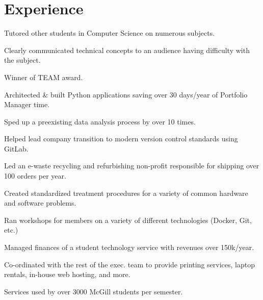 \documentclass[]{willguthrie-resume}
\begin{document}
\begin{minipage}[t]{0.66\textwidth}


	\section{Experience}

	\vspace{\topsep} %
	\begin{tightemize}
		\item Tutored other students in Computer Science on numerous subjects.
		\item Clearly communicated technical concepts to an audience having difficulty with the subject. 
		\item Winner of TEAM award.
	\end{tightemize}

	\begin{tightemize}
		\item Architected \& built Python applications saving over 30 days/year of Portfolio Manager time.
		\item Sped up a preexisting data analysis process by over 10 times.
		\item Helped lead company transition to modern version control standards using GitLab.
	\end{tightemize}

	\begin{tightemize}
		\item Led an e-waste recycling and refurbishing non-profit responsible for shipping over 100 orders per year.
		\item Created standardized treatment procedures for a variety of common hardware and software problems.
		\item Ran workshops for members on a variety of different technologies (Docker, Git, etc.) 
	\end{tightemize}

	\begin{tightemize}
		\item Managed finances of a student technology service with revenues over 150k/year.
		\item Co-ordinated with the rest of the exec. team to provide printing services, laptop rentals, in-house web hosting, and more.
		\item Services used by over 3000 McGill students per semester.
	\end{tightemize}


\end{minipage}
\end{document}
